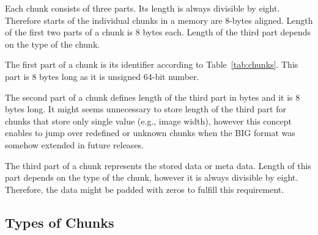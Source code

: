 \documentclass{article}
\begin{document}
Each chunk consists of three parts. Its length is always divisible by eight. Therefore starts of the individual chunks in a memory are 8-bytes aligned. Length of the first two parts of a chunk is 8 bytes each. Length of the third part depends on the type of the chunk.

The first part of a chunk is its identifier according to Table~\ref{tab:chunks}. This part is 8 bytes long as it is unsigned 64-bit number.

The second part of a chunk defines length of the third part in bytes and it is 8 bytes long. It might seems unnecessary to store length of the third part for chunks that store only single value (e.g., image width), however this concept enables to jump over redefined or unknown chunks when the BIG format was somehow extended in future releases.

The third part of a chunk represents the stored data or meta data. Length of this part depends on the type of the chunk, however it is always divisible by eight. Therefore, the data might be padded with zeros to fulfill this requirement.

\subsection{Types of Chunks}
\end{document}
